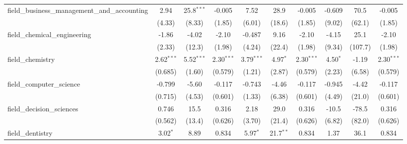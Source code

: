 \begin{tabular}{lccccccccc}
   field\_business\_management\_and\_accounting                & 2.94          & 25.8$^{***}$  & -0.005        & 7.52          & 28.9           & -0.005        & -0.609        & 70.5          & -0.005\\   
                                                               & (4.33)        & (8.33)        & (1.85)        & (6.01)        & (18.6)         & (1.85)        & (9.02)        & (62.1)        & (1.85)\\   
   field\_chemical\_engineering                                & -1.86         & -4.02         & -2.10         & -0.487        & 9.16           & -2.10         & -4.15         & 25.1          & -2.10\\   
                                                               & (2.33)        & (12.3)        & (1.98)        & (4.24)        & (22.4)         & (1.98)        & (9.34)        & (107.7)       & (1.98)\\   
   field\_chemistry                                            & 2.62$^{***}$  & 5.52$^{***}$  & 2.30$^{***}$  & 3.79$^{***}$  & 4.97$^{*}$     & 2.30$^{***}$  & 4.50$^{*}$    & -1.19         & 2.30$^{***}$\\   
                                                               & (0.685)       & (1.60)        & (0.579)       & (1.21)        & (2.87)         & (0.579)       & (2.23)        & (6.58)        & (0.579)\\   
   field\_computer\_science                                    & -0.799        & -5.60         & -0.117        & -0.743        & -4.46          & -0.117        & -0.945        & -4.42         & -0.117\\   
                                                               & (0.715)       & (4.53)        & (0.601)       & (1.33)        & (6.38)         & (0.601)       & (4.49)        & (21.0)        & (0.601)\\   
   field\_decision\_sciences                                   & 0.746         & 15.5          & 0.316         & 2.18          & 29.0           & 0.316         & -10.5         & -78.5         & 0.316\\   
                                                               & (0.562)       & (13.4)        & (0.626)       & (3.70)        & (21.4)         & (0.626)       & (6.82)        & (82.0)        & (0.626)\\   
   field\_dentistry                                            & 3.02$^{*}$    & 8.89          & 0.834         & 5.97$^{*}$    & 21.7$^{**}$    & 0.834         & 1.37          & 36.1          & 0.834\\   

\end{tabular}
